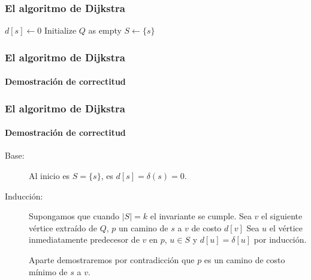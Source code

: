 \documentclass[english, spanish, fleqn,%
hyperref = {colorlinks, urlcolor = blue}%
]{beamer}
\begin{document}
\begin{frame}
  \frametitle{El algoritmo de Dijkstra}

  \begin{algorithm}[H]
    \DontPrintSemicolon

    \(d[s] \leftarrow 0\) \;
    Initialize \(Q\) as empty \;
    \(S \leftarrow \{ s \}\) \;
  \end{algorithm}
\end{frame}

\begin{frame}
  \setcounter{beamerpauses}{2}
  \frametitle{El algoritmo de Dijkstra}
  \framesubtitle{Demostración de correctitud}

\end{frame}

\begin{frame}
  \setcounter{beamerpauses}{2}
  \frametitle{El algoritmo de Dijkstra}
  \framesubtitle{Demostración de correctitud}

  \begin{description}
  \item[Base:]
    Al inicio es \(S = \{ s \}\),
    es \(d[s] = \delta(s) = 0\).
  \item[Inducción:]
    Supongamos que cuando \(\lvert S \rvert = k\)
    el invariante se cumple.
    Sea \(v\) el siguiente vértice extraído de \(Q\),
    \(p\) un camino de \(s\) a \(v\) de costo \(d[v]\)
    Sea \(u\) el vértice inmediatamente predecesor de \(v\) en \(p\),
    \(u \in S\) y \(d[u] = \delta[u]\) por inducción.

    Aparte demostraremos por contradicción
    que \(p\) es un camino de costo mínimo de \(s\) a \(v\).
  \end{description}
\end{frame}
\end{document}
